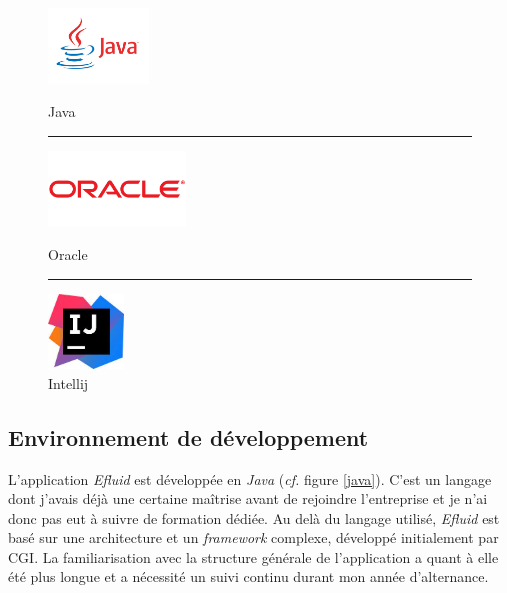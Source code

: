 \documentclass[a4paper, 12pt]{report}
\begin{document}
\begin{figure}[b]
  \begin{center}
    \begin{minipage}{4cm}
      \begin{center}
        \includegraphics[height=2cm]{../res/java.jpg}
        \caption{Java}
        \label{java}
      \end{center}
    \end{minipage}
    \rule{1cm}{0cm}
    \begin{minipage}{4cm}
      \begin{center}
        \includegraphics[height=2cm]{../res/oracle.png}
        \caption{Oracle}
        \label{oracle}
      \end{center}
    \end{minipage}
    \rule{1cm}{0cm}
    \begin{minipage}{4cm}
      \begin{center}
        \includegraphics[height=2cm]{../res/intellij.jpg}
        \vspace{0.1cm}
        \caption{Intellij}
        \label{intellij}
      \end{center}
    \end{minipage}
  \end{center}
\end{figure}

\subsection{Environnement de développement}

L'application \textit{Efluid} est développée en \textit{Java} (\textit{cf.} figure \ref{java}). C'est un langage dont j'avais déjà une certaine maîtrise avant de rejoindre l'entreprise et je n'ai donc pas eut à suivre de formation dédiée. Au delà du langage utilisé, \textit{Efluid} est  basé sur une architecture et un \textit{framework} complexe, développé initialement par CGI. La familiarisation avec la structure générale de l'application a quant à elle été plus longue et a nécessité un suivi continu durant mon année d'alternance. 
\end{document}
